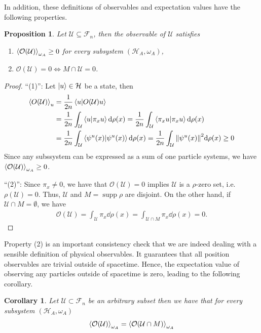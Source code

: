 \documentclass[reqno,11pt]{amsart}
\DeclareMathOperator{\supp}{supp}
\renewcommand{\H}{\mathcal{H}}
\newcommand{\F}{{\mathcal{F}}}
\newtheorem{proposition}[definition]{Proposition}
\newtheorem{corollary}[definition]{Corollary}
\numberwithin{equation}{section}
\begin{document}
In addition, these definitions of observables and expectation values have the following properties.
\begin{proposition}
    \label{prop:positivity-of-the-spacetime-observables}
    Let $\mathcal{U} \subseteq \F_n$, then the observable of $\mathcal{U}$ satisfies
    \begin{enumerate}
        \item $\displaystyle \expval{\mathcal{O}(\mathcal{U})}_{\omega_A} \geq 0$ for every subsystem $(\H_A, \omega_A)$,
        \item $\displaystyle \mathcal{O}(\mathcal{U}) = 0 \Leftrightarrow M \cap \mathcal{U} = 0$.
    \end{enumerate}
\end{proposition}
\begin{proof}
    ``(1)'': Let $\ket{u} \in \H$ be a state, then
    \begin{align*}
        \expval{O(\mathcal{U})}_{u} &= \frac{1}{2n} \braket{u}{O(\mathcal{U}) u} \\
        &= \frac{1}{2n} \int_\mathcal{U} \braket{u}{\pi_x u} \dd \rho(x) = \frac{1}{2n} \int_\mathcal{U} \braket{\pi_x u} \dd \rho(x)\\
        &= \frac{1}{2n} \int_\mathcal{U} \braket{\psi^{u}(x)} \dd \rho(x) = \frac{1}{2n} \int_\mathcal{U} \norm{\psi^{u}(x)}^2 \dd \rho(x) \geq 0
    \end{align*}
    Since any subssystem can be expressed as a sum of one particle systems, we have $\expval{\mathcal{O}(\mathcal{U})}_{\omega_A} \geq 0$.

    \noindent
    ``(2)'': Since $\pi_x \neq 0$, we have that $\mathcal{O}(\mathcal{U}) = 0$ implies $\mathcal{U}$ is a $\rho$-zero set,
    i.e.~$\rho(\mathcal{U}) = 0$.
    Thus, $\mathcal{U}$ and $M = \supp \rho$ are disjoint.
    On the other hand, if $\mathcal{U} \cap M = \emptyset$, we have
    \begin{align*}
        \mathcal{O}(\mathcal{U}) = \int_{\mathcal{U}} \pi_x \dd \rho(x) = \int_{\mathcal{U} \cap M} \pi_x \dd \rho(x) = 0.
    \end{align*}
\end{proof}

Property (2) is an important consistency check that we are indeed dealing with a sensible definition of physical observables.
It guarantees that all position observables are trivial outside of spacetime.
Hence, the expectation value of observing any particles outside of spacetime is zero, leading to the following corollary.
\begin{corollary}
    Let $\mathcal{U} \subset {\F_n}$ be an arbitrary subset then we have that for every subsystem $(\H_A, \omega_A)$
    \begin{align}
        \expval{\mathcal{O}(\mathcal{U})}_{\omega_A} = \expval{\mathcal{O}(\mathcal{U} \cap M)}_{\omega_A}
    \end{align}
\end{corollary}
\end{document}
